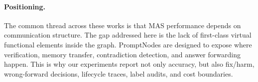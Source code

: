 \paragraph{Positioning.}
The common thread across these works is that MAS performance depends on communication structure. The gap addressed here is the lack of first-class virtual functional elements inside the graph. PromptNodes are designed to expose where verification, memory transfer, contradiction detection, and answer forwarding happen. This is why our experiments report not only accuracy, but also fix/harm, wrong-forward decisions, lifecycle traces, label audits, and cost boundaries.
